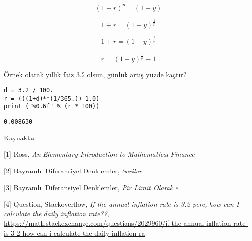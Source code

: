 \documentclass[12pt,fleqn]{article}\usepackage{../../common}
\begin{document}
$$
(1+r)^p = (1+y) 
$$

$$
 1+r = (1+y)^{\frac{1}{p}} 
$$

$$
 1+r = (1+y)^{\frac{1}{p}} 
$$ 

$$
r =  (1+y)^{\frac{1}{p}} -1
$$

Örnek olarak yıllık faiz 3.2 olsun, günlük artış yüzde kaçtır?

\begin{verbatim}
d = 3.2 / 100.
r = (((1+d)**(1/365.))-1.0)
print ("%0.6f" % (r * 100))
\end{verbatim}

\begin{verbatim}
0.008630
\end{verbatim}

Kaynaklar

[1] Ross, {\em An Elementary Introduction to Mathematical Finance}

[2] Bayramlı, Diferansiyel Denklemler, {\em Seriler}

[3] Bayramlı, Diferansiyel Denklemler, {\em Bir Limit Olarak $e$}

[4] Question, Stackoverflow, {\em If the annual inflation rate is 3.2 perc, how can I calculate the daily inflation rate??},
    \url{https://math.stackexchange.com/questions/2029960/if-the-annual-inflation-rate-is-3-2-how-can-i-calculate-the-daily-inflation-ra}

  
\end{document}
